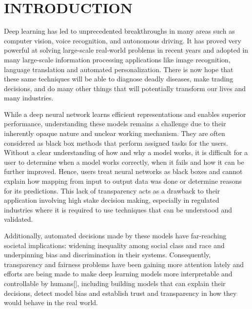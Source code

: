 %
%
\chapter{INTRODUCTION}
\thispagestyle{empty}


Deep learning has led to unprecedented breakthroughs in many areas such as computer vision, voice recognition, and autonomous driving.  It has proved very powerful at solving large-scale real-world problems in recent years and adopted in many large-scale information processing applications like image recognition, language translation and automated personalization. There is now hope that these same techniques will be able to diagnose deadly diseases,  make trading decisions, and do many other things that will potentially transform our lives and many industries. 

While a deep neural network learns efficient representations and enables superior performance, understanding these models remains a challenge due to their inherently opaque nature and unclear working mechanism. They are often considered as black box methods that perform assigned tasks for the users. Without a clear understanding of how and why a model works, it is difficult for a user to determine when a model works correctly, when it fails and how it can be further improved. Hence, users treat neural networks as black boxes and cannot explain how mapping from input to output data was done or determine reasons for its predictions. This lack of transparency acts as a drawback to their application involving high stake decision making, especially in regulated industries where it is required to use techniques that can be understood and validated.

Additionally, automated decisions made by these models have far-reaching societal implications: widening inequality among social class and race and underpinning bias and discrimination in their systems. Consequently, transparency and fairness problems have been gaining more attention lately and efforts are being made to make deep learning models more interpretable and controllable by humans[], including building models that can explain their decisions, detect model bias and establish trust and transparency in how they would behave in the real world.

